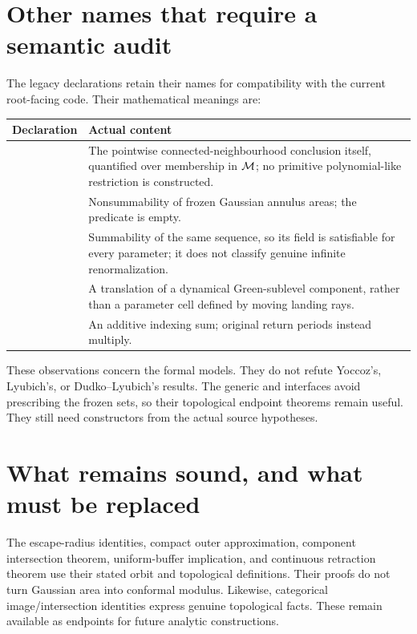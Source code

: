 \section{Other names that require a semantic audit}

The legacy declarations retain their names for compatibility with the
current root-facing code.  Their mathematical meanings are:

\begin{center}\small
\begin{tabularx}{\textwidth}{@{}P{0.38\textwidth}Y@{}}
\textbf{Declaration} & \textbf{Actual content}\\
\hline
{} &
The pointwise connected-neighbourhood conclusion itself, quantified
over membership in $\mathcal M$; no primitive polynomial-like restriction is
constructed.\\
 &
Nonsummability of frozen Gaussian annulus areas; the predicate is empty.\\
 &
Summability of the same sequence, so its field is satisfiable for every
parameter; it does not classify genuine infinite renormalization.\\
 &
A translation of a dynamical Green-sublevel component, rather than a
parameter cell defined by moving landing rays.\\
 &
An additive indexing sum; original return periods instead multiply.\\
\end{tabularx}
\end{center}

These observations concern the formal models.  They do not refute
Yoccoz's, Lyubich's, or Dudko--Lyubich's results.
The generic  and
 interfaces avoid prescribing the frozen sets,
so their topological endpoint theorems remain useful.  They still need
constructors from the actual source hypotheses.

\section{What remains sound, and what must be replaced}

The escape-radius identities, compact outer approximation, component
intersection theorem, uniform-buffer implication, and continuous
retraction theorem use their stated orbit and topological definitions.
Their proofs do not turn Gaussian area into conformal modulus.
Likewise, categorical image/intersection identities express genuine
topological facts.  These remain available as endpoints for future
analytic constructions.

